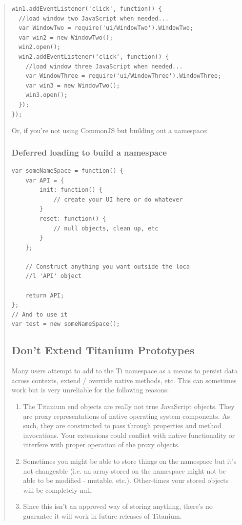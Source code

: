 \documentclass[11pt]{book}
\begin{document}
\begin{quotation}
\begin{lstlisting}[frame=single]
win1.addEventListener('click', function() {
  //load window two JavaScript when needed...
  var WindowTwo = require('ui/WindowTwo').WindowTwo;
  var win2 = new WindowTwo();
  win2.open();
  win2.addEventListener('click', function() {
    //load window three JavaScript when needed...
    var WindowThree = require('ui/WindowThree').WindowThree;
    var win3 = new WindowTwo();
    win3.open();
  });
});
\end{lstlisting}

Or, if you're not using CommonJS but building out a namespace:
\subsubsection{Deferred loading to build a namespace}
\begin{lstlisting}[frame=single]
var someNameSpace = function() {
    var API = {
        init: function() {
            // create your UI here or do whatever
        }
        reset: function() {
            // null objects, clean up, etc
        }
    };

    // Construct anything you want outside the loca
    //l 'API' object

    return API;
};
// And to use it
var test = new someNameSpace();
\end{lstlisting}

\subsection{Don't Extend Titanium Prototypes}
Many users attempt to add to the Ti namespace as a means to persist data across contexts, extend / override native methods, etc. This can sometimes work but is very unreliable for the following reasons:
\begin{enumerate}
    \item The Titanium end objects are really not true JavaScript objects. They are proxy representations of native operating system components. As such, they are constructed to pass through properties and method invocations. Your extensions could conflict with native functionality or interfere with proper operation of the proxy objects.
    \item Sometimes you might be able to store things on the namespace but it's not changeable (i.e. an array stored on the namespace might not be able to be modified - mutable, etc.). Other-times your stored objects will be completely null.
    \item Since this isn't an approved way of storing anything, there's no guarantee it will work in future releases of Titanium.
\end{enumerate}


\end{quotation}
\end{document}
